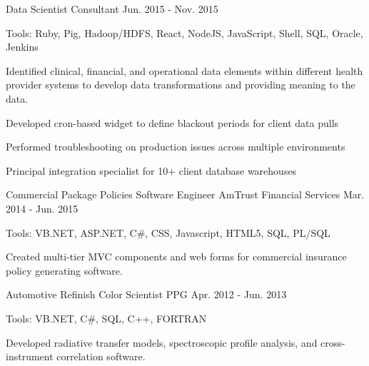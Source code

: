 \begin{cventries}
  \cvexpsubposition
    {Data Scientist Consultant} %
    {Jun. 2015 - Nov. 2015} %
    {}
    {
      \begin{cvheavyparagraph}
        Tools: Ruby, Pig, Hadoop/HDFS, React, NodeJS, JavaScript, Shell, SQL, Oracle, Jenkins
      \end{cvheavyparagraph}
    }
    {
      \begin{cvparagraph}
        Identified clinical, financial, and operational data elements within different health provider systems to develop data transformations and providing meaning to the data. 
      \end{cvparagraph}
      \begin{cvitems} %
        \item {Developed cron-based widget to define blackout periods for client data pulls}
        \item {Performed troubleshooting on production issues across multiple environments}
        \item {Principal integration specialist for 10+ client database warehouses}
      \end{cvitems}
    }

  \cvexpentry
    {Commercial Package Policies}
    {Software Engineer} %
    {AmTrust Financial Services}
    {Mar. 2014 - Jun. 2015}
    {
      \begin{cvheavyparagraph}
        Tools: VB.NET, ASP.NET, C\#, CSS, Javascript, HTML5, SQL, PL/SQL
      \end{cvheavyparagraph}
    }
    {
      \begin{cvcompactparagraph}
        Created multi-tier MVC components and web forms for commercial insurance policy generating software.
      \end{cvcompactparagraph}
    }

  \cvexpentry
    {Automotive Refinish} %
    {Color Scientist} %
    {PPG} %
    {Apr. 2012 - Jun. 2013}
    {
      \begin{cvheavyparagraph}
        Tools: VB.NET, C\#, SQL, C++, FORTRAN
      \end{cvheavyparagraph}
    }
    {
      \begin{cvcompactparagraph}
        Developed radiative transfer models, spectroscopic profile analysis, and cross-instrument correlation software.
      \end{cvcompactparagraph}
    }


\end{cventries}
